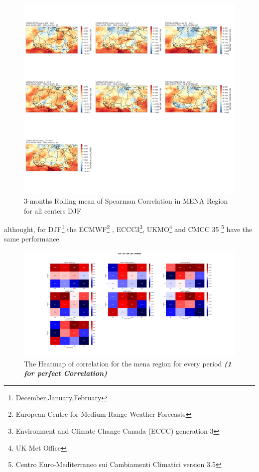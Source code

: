 \begin{figure}[H]
\includegraphics[scale=0.3]{CORR_DJF.png}
\caption{3-months Rolling mean of Spearman Correlation in MENA Region for all centers DJF}
\end{figure}

althought, for DJF\footnote{December,January,February} the ECMWF\footnote{European Centre for Medium-Range Weather Forecasts } , ECCC3\footnote{Environment and Climate Change Canada (ECCC) generation 3}, UKMO\footnote{UK Met Office} and CMCC 35 \footnote{Centro Euro-Mediterraneo sui Cambiamenti Climatici version 3.5} have the same performance.

\begin{figure}[H]
	\centering
	\includegraphics[scale=0.25]{corr_T2M_ PERIOD.png}
	\caption{The Heatmap of correlation for the mena region for every period \textbf{\textit{(1 for perfect Correlation)} }}
\end{figure}




